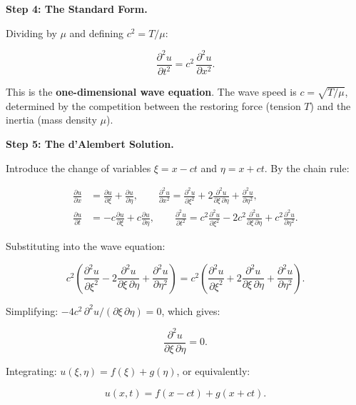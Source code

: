 \textbf{Step 4: The Standard Form.}

Dividing by $\mu$ and defining $c^2 = T/\mu$:

\begin{equation}
\boxed{\frac{\partial^2 u}{\partial t^2} = c^2\,\frac{\partial^2 u}{\partial x^2}.}
\end{equation}

This is the \textbf{one-dimensional wave equation}. The wave speed is $c = \sqrt{T/\mu}$, determined by the competition between the restoring force (tension $T$) and the inertia (mass density $\mu$).

\textbf{Step 5: The d'Alembert Solution.}

Introduce the change of variables $\xi = x - ct$ and $\eta = x + ct$. By the chain rule:

\begin{align}
\frac{\partial u}{\partial x} &= \frac{\partial u}{\partial \xi} + \frac{\partial u}{\partial \eta}, \qquad \frac{\partial^2 u}{\partial x^2} = \frac{\partial^2 u}{\partial \xi^2} + 2\frac{\partial^2 u}{\partial \xi\,\partial \eta} + \frac{\partial^2 u}{\partial \eta^2}, \\
\frac{\partial u}{\partial t} &= -c\frac{\partial u}{\partial \xi} + c\frac{\partial u}{\partial \eta}, \qquad \frac{\partial^2 u}{\partial t^2} = c^2\frac{\partial^2 u}{\partial \xi^2} - 2c^2\frac{\partial^2 u}{\partial \xi\,\partial \eta} + c^2\frac{\partial^2 u}{\partial \eta^2}.
\end{align}

Substituting into the wave equation:

\begin{equation}
c^2\left(\frac{\partial^2 u}{\partial \xi^2} - 2\frac{\partial^2 u}{\partial \xi\,\partial \eta} + \frac{\partial^2 u}{\partial \eta^2}\right) = c^2\left(\frac{\partial^2 u}{\partial \xi^2} + 2\frac{\partial^2 u}{\partial \xi\,\partial \eta} + \frac{\partial^2 u}{\partial \eta^2}\right).
\end{equation}

Simplifying: $-4c^2\,\partial^2 u/(\partial\xi\,\partial\eta) = 0$, which gives:

\begin{equation}
\frac{\partial^2 u}{\partial \xi\,\partial \eta} = 0.
\end{equation}

Integrating: $u(\xi, \eta) = f(\xi) + g(\eta)$, or equivalently:

\begin{equation}
\boxed{u(x,t) = f(x - ct) + g(x + ct).}
\end{equation}

